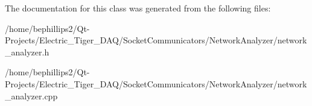 The documentation for this class was generated from the following files\+:\begin{DoxyCompactItemize}
\item 
/home/bephillips2/\+Qt-\/\+Projects/\+Electric\+\_\+\+Tiger\+\_\+\+D\+A\+Q/\+Socket\+Communicators/\+Network\+Analyzer/network\+\_\+analyzer.\+h\item 
/home/bephillips2/\+Qt-\/\+Projects/\+Electric\+\_\+\+Tiger\+\_\+\+D\+A\+Q/\+Socket\+Communicators/\+Network\+Analyzer/network\+\_\+analyzer.\+cpp\end{DoxyCompactItemize}
